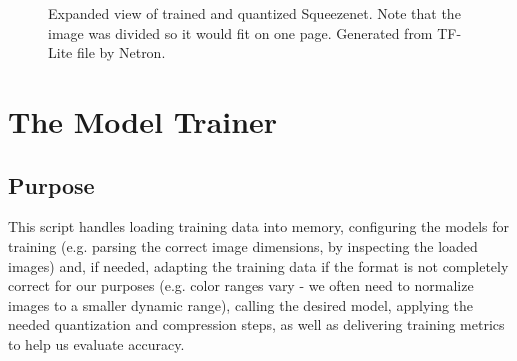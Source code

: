 \begin{figure}[!tbp]
\caption{Expanded view of trained and quantized Squeezenet. Note that the image was divided so it would fit on one page. Generated from TF-Lite file by Netron. \cite{netron}}
\label{netron_sqnet}
\end{figure}

\section{The Model Trainer}
\subsection{Purpose}
This script handles loading training data into memory, configuring the models for training (e.g. parsing the correct image dimensions, by inspecting the loaded images) and, if needed, adapting the training data if the format is not completely correct for our purposes (e.g. color ranges vary - we often need to normalize images to a smaller dynamic range), calling the desired model, applying the needed quantization and compression steps, as well as delivering training metrics to help us evaluate accuracy. 
